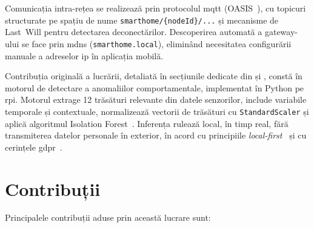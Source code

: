 Comunicația intra-rețea se realizează prin protocolul \gls{mqtt}
(\mbox{OASIS}~\cite{oasis2019mqtt}), cu topicuri structurate pe spațiu de
nume \texttt{smarthome/\{nodeId\}/...} și mecanisme de Last~Will pentru
detectarea deconectărilor.  Descoperirea automată a gateway-ului se face prin
\gls{mdns} (\texttt{smarthome.local}), eliminând necesitatea configurării
manuale a adreselor \gls{ip} în aplicația mobilă.

Contribuția originală a lucrării, detaliată în secțiunile dedicate din
 și , constă în motorul de
detectare a anomaliilor comportamentale, implementat în Python pe
\gls{rpi}.  Motorul extrage 12 trăsături relevante din datele senzorilor,
include variabile temporale și contextuale, normalizează vectorii de
trăsături cu \texttt{StandardScaler} și aplică algoritmul Isolation
Forest~\cite{liu2008isolation}.  Inferența rulează local, în timp real, fără
transmiterea datelor personale în exterior, în acord cu principiile
\emph{local-first}~\cite{kleppmann2019localfirst} și cu cerințele
\gls{gdpr}~\cite{gdpr2016}.

\section{Contribuții}

Principalele contribuții aduse prin această lucrare sunt:

